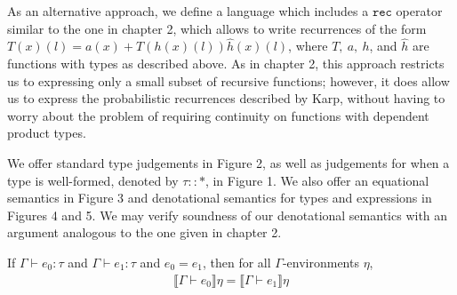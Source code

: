 As an alternative approach, we define a language which includes a $\texttt{rec}$ operator similar to the one in chapter 2,
 which allows to write recurrences of the form $T(x)(l) = a(x) + T(h(x)(l))\hat{h}(x)(l)$, where $T, \ a, \ h$, and $\hat{h}$ 
 are functions with types as described above. As in chapter 2, this approach restricts us to expressing only a small subset
 of recursive functions; however, it does allow us to express the probabilistic recurrences described by Karp,
 without having to worry about the problem of requiring continuity on functions with dependent product types. 

We offer standard type judgements in Figure 2, as well as judgements for when a type is well-formed, denoted by
 $\tau :: *$, in Figure 1. We 
 also offer an equational semantics in Figure 3 and denotational semantics for types and expressions in Figures 4 and 5. 
 We may verify soundness of our denotational semantics with an argument analogous to the one given in chapter 2. 
 
  \begin{thm}
  If $\Gamma \vdash e_0 : \tau$ and $\Gamma \vdash e_1 : \tau$ and $e_0 = e_1$, then for all $\Gamma$-environments
  $\eta$,   
 \begin{align*}
 \llbracket \Gamma \vdash e_0 \rrbracket \eta 
 = \llbracket \Gamma \vdash e_1 \rrbracket \eta 
 \end{align*} 
 \end{thm}

